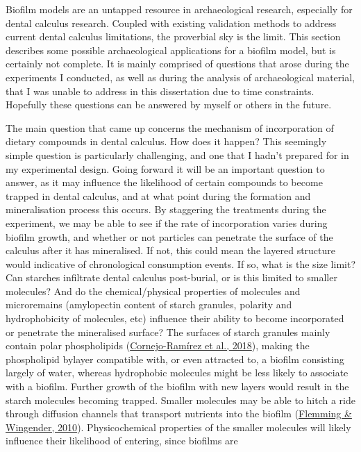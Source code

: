 \documentclass[
  letterpaper,
]{book}
\begin{document}
Biofilm models are an untapped resource in archaeological research,
especially for dental calculus research. Coupled with existing
validation methods to address current dental calculus limitations, the
proverbial sky is the limit. This section describes some possible
archaeological applications for a biofilm model, but is certainly not
complete. It is mainly comprised of questions that arose during the
experiments I conducted, as well as during the analysis of
archaeological material, that I was unable to address in this
dissertation due to time constraints. Hopefully these questions can be
answered by myself or others in the future.

The main question that came up concerns the mechanism of incorporation
of dietary compounds in dental calculus. How does it happen? This
seemingly simple question is particularly challenging, and one that I
hadn't prepared for in my experimental design. Going forward it will be
an important question to answer, as it may influence the likelihood of
certain compounds to become trapped in dental calculus, and at what
point during the formation and mineralisation process this occurs. By
staggering the treatments during the experiment, we may be able to see
if the rate of incorporation varies during biofilm growth, and whether
or not particles can penetrate the surface of the calculus after it has
mineralised. If not, this could mean the layered structure would
indicative of chronological consumption events. If so, what is the size
limit? Can starches infiltrate dental calculus post-burial, or is this
limited to smaller molecules? And do the chemical/physical properties of
molecules and microremains (amylopectin content of starch granules,
polarity and hydrophobicity of molecules, etc) influence their ability
to become incorporated or penetrate the mineralised surface? The
surfaces of starch granules mainly contain polar phospholipids
(\protect\hyperlink{ref-cornejo-ramirezStructuralCharacteristics2018}{Cornejo-Ramírez
et al., 2018}), making the phospholipid bylayer compatible with, or even
attracted to, a biofilm consisting largely of water, whereas hydrophobic
molecules might be less likely to associate with a biofilm. Further
growth of the biofilm with new layers would result in the starch
molecules becoming trapped. Smaller molecules may be able to hitch a
ride through diffusion channels that transport nutrients into the
biofilm (\protect\hyperlink{ref-flemmingBiofilmMatrix2010}{Flemming \&
Wingender, 2010}). Physicochemical properties of the smaller molecules
will likely influence their likelihood of entering, since biofilms are
\end{document}
